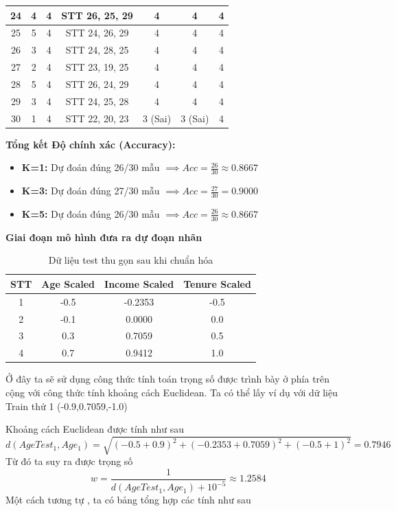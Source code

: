 \documentclass[12pt,a4paper]{article}
\begin{document}
\begin{table}[H]
{\begin{tabular}{|c|c|c|c|c|c|c|}
24 & 4 & 4 & STT 26, 25, 29 & 4 & 4 & 4 \\ \hline
25 & 5 & 4 & STT 24, 26, 29 & 4 & 4 & 4 \\ \hline
26 & 3 & 4 & STT 24, 28, 25 & 4 & 4 & 4 \\ \hline
27 & 2 & 4 & STT 23, 19, 25 & 4 & 4 & 4 \\ \hline
28 & 5 & 4 & STT 26, 24, 29 & 4 & 4 & 4 \\ \hline
29 & 3 & 4 & STT 24, 25, 28 & 4 & 4 & 4 \\ \hline
30 & 1 & 4 & STT 22, 20, 23 & 3 (Sai) & 3 (Sai) & 4 \\ \hline
\end{tabular}%
}
\end{table}

\textbf{Tổng kết Độ chính xác (Accuracy):}
\begin{itemize}
    \item \textbf{K=1:} Dự đoán đúng 26/30 mẫu $\implies Acc = \frac{26}{30} \approx 0.8667$
    \item \textbf{K=3:} Dự đoán đúng 27/30 mẫu $\implies Acc = \frac{27}{30} = 0.9000$
    \item \textbf{K=5:} Dự đoán đúng 26/30 mẫu $\implies Acc = \frac{26}{30} \approx 0.8667$
\end{itemize}
\textbf{Giai đoạn mô hình đưa ra dự đoạn nhãn} 
\begin{table}[H]
\centering
\begin{tabular}{|c|c|c|c|}
\hline
\textbf{STT} & \textbf{Age Scaled} & \textbf{Income Scaled} & \textbf{Tenure Scaled} \\ \hline
1 & -0.5 & -0.2353 & -0.5 \\ \hline
2 & -0.1 & 0.0000 & 0.0 \\ \hline
3 & 0.3 & 0.7059 & 0.5 \\ \hline
4 & 0.7 & 0.9412 & 1.0 \\ \hline
\end{tabular}
\caption{Dữ liệu test thu gọn sau khi chuẩn hóa}
\end{table}

Ở đây ta sẽ sử dụng công thức tính toán trọng số được trình bày ở phía trên cộng với công thức tính khoảng cách Euclidean. 
Ta có thể lấy ví dụ với dữ liệu Train thứ 1 (-0.9,0.7059,-1.0)

Khoảng cách Euclidean được tính như sau
\[
d(AgeTest_1,Age_1)=\sqrt{(-0.5+0.9)^2+(-0.2353+0.7059)^2+(-0.5+1)^2}=0.7946
\]
\newline
Từ đó ta suy ra được trọng số
\[
w=\frac{1}{d(AgeTest_1,Age_1)+10^{-5}}\approx1.2584
\] 
Một cách tương tự , ta có bảng tổng hợp các tính như sau
\end{document}
